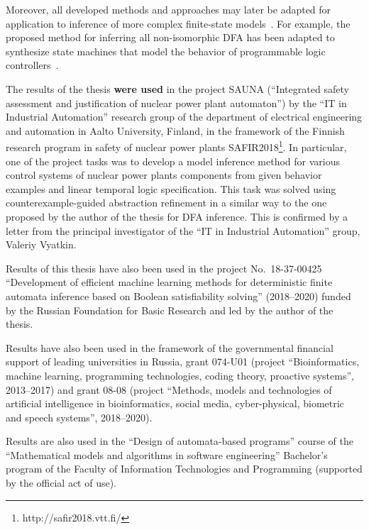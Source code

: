 Moreover, all developed methods and approaches may later be adapted for application to inference of more complex finite-state models~\cite{ulyantsev-phd-13-en}.
For example, the proposed method for inferring all non-isomorphic DFA has been adapted to synthesize state machines that model the behavior of programmable logic controllers~\cite{DBLP:journals/tii/ChivilikhinPCCV20}.

The results of the thesis \textbf{were used} in the project SAUNA (``Integrated safety assessment and justification of nuclear power plant automaton'') by the ``IT in Industrial Automation'' research group of the department of electrical engineering and automation in Aalto University, Finland, in the framework of the Finnish research program in 
safety of nuclear power plants SAFIR2018\footnote{http://safir2018.vtt.fi/}.
In particular, one of the project tasks was to develop a model inference method for various control systems of nuclear power plants components from given behavior examples and linear temporal logic specification.
This task was solved using counterexample-guided abstraction refinement in a similar way to the one proposed by the author of the thesis for DFA inference.
This is confirmed by a letter from the principal investigator of the ``IT in Industrial Automation'' group, Valeriy Vyatkin.

Results of this thesis have also been used in the project No.~18-37-00425 ``Development of efficient machine learning methods for deterministic finite automata inference
based on Boolean satisfiability solving'' (2018--2020) funded by the Russian Foundation for Basic Research and led by the author of the thesis.

Results have also been used in the framework of the governmental financial support of leading universities in Russia, grant 074-U01 (project ``Bioinformatics, machine learning, programming technologies, coding theory, proactive systems'', 2013--2017) and grant 08-08 (project ``Methods, models and technologies of artificial intelligence in 
bioinformatics, social media, cyber-physical, biometric and speech systems'', 2018--2020).

Results are also used in the ``Design of automata-based programs'' course of the ``Mathematical models and algorithms in software engineering'' Bachelor's program of the 
Faculty of Information Technologies and Programming (supported by the official act of use).

